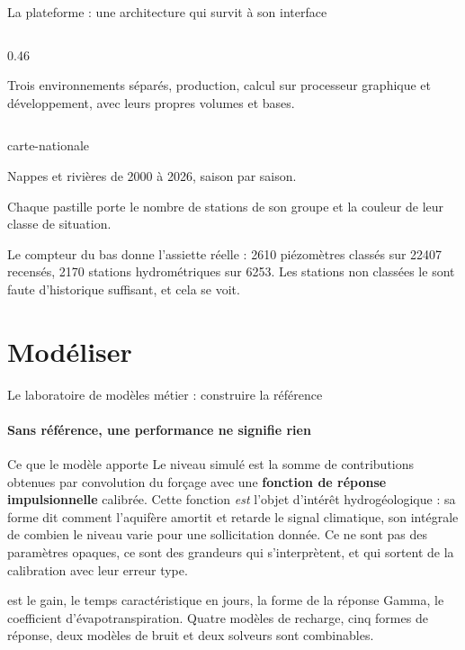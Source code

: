 \documentclass[aspectratio=169,11pt]{beamer}
\begin{document}
\begin{frame}{La plateforme : une architecture qui survit à son interface}
\begin{columns}[T]
\begin{column}{0.46\textwidth}
\vspace{0.2em}
{\footnotesize\color{grisardoise} Trois environnements séparés, production, calcul sur processeur
graphique et développement, avec leurs propres volumes et bases.\par}
\end{column}
\end{columns}
\end{frame}

{carte-nationale}
{Nappes et rivières de 2000 à 2026, saison par saison.

\vspace{0.5em}
Chaque pastille porte le nombre de stations de son groupe et la couleur de leur classe de
situation.

\vspace{0.5em}
Le compteur du bas donne l'assiette réelle : \num{2610} piézomètres classés sur \num{22407}
recensés, \num{2170} stations hydrométriques sur \num{6253}. Les stations non classées le sont
faute d'historique suffisant, et cela se voit.}



\section{Modéliser}
\begin{frame}{Le laboratoire de modèles métier : construire la référence}
\framesubtitle{Sans référence, une performance ne signifie rien}

\small
\begin{apport}{Ce que le modèle apporte}
Le niveau simulé est la somme de contributions obtenues par convolution du forçage avec une
\textbf{fonction de réponse impulsionnelle} calibrée. Cette fonction \emph{est} l'objet d'intérêt
hydrogéologique : sa forme dit comment l'aquifère amortit et retarde le signal climatique, son
intégrale de combien le niveau varie pour une sollicitation donnée. Ce ne sont pas des paramètres
opaques, ce sont des grandeurs qui s'interprètent, et qui sortent de la calibration avec leur
erreur type.
\end{apport}

\vspace{0.15cm}

\vspace{0.15cm}
{\scriptsize\color{grisardoise}  est le gain,  le temps
caractéristique en jours,  la forme de la réponse Gamma,  le
coefficient d'évapotranspiration. Quatre modèles de recharge, cinq formes de réponse, deux
modèles de bruit et deux solveurs sont combinables.\par}
\end{frame}
\end{document}

